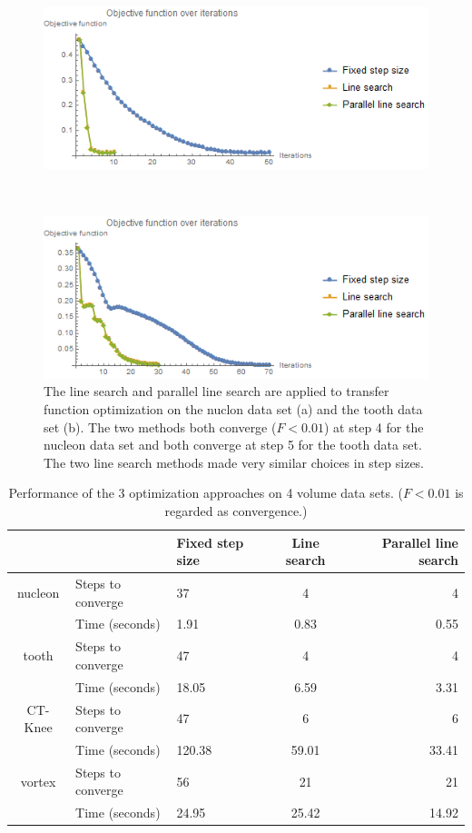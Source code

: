 \begin{figure}
	\centering
	\begin{minipage}{.49\textwidth}
		\includegraphics[width=1\linewidth]{images/CT-Knee_naive_rms_fixed_linesearch_parallel}
		\subcaption{}
	\end{minipage}~
	\begin{minipage}{.49\textwidth}
		\includegraphics[width=1\linewidth]{images/vortex_naive_rms_fixed_linesearch_parallel}
		\subcaption{}
	\end{minipage}
	\caption{The line search and parallel line search are applied to transfer function optimization on the nuclon data set (a) and the tooth data set (b). The two methods both converge ($F<0.01$) at step 4 for the nucleon data set and both converge at step 5 for the tooth data set. The two line search methods made very similar choices in step sizes.}
	\label{fig:CT-Knee_naive_vortex_naive_rms_linesearch}
\end{figure}

\begin{table}[h]
\begin{tabular}{ c | l | l c r }
& & Fixed step size & Line search & Parallel line search \\
\hline
nucleon & Steps to converge & 37 & 4 & 4 \\
& Time (seconds) & 1.91 & 0.83 & 0.55 \\
\hline
tooth & Steps to converge & 47 & 4 & 4 \\
& Time (seconds) & 18.05 & 6.59 & 3.31 \\
\hline
CT-Knee & Steps to converge & 47 & 6 & 6 \\
& Time (seconds) & 120.38 & 59.01 & 33.41 \\
\hline
vortex & Steps to converge & 56 & 21 & 21 \\
& Time (seconds) & 24.95 & 25.42 & 14.92 \\
\end{tabular}
\caption[Table caption text]{Performance of the 3 optimization approaches on 4 volume data sets. ($ F<0.01 $ is regarded as convergence.)}
\label{table:nucleon_table}
\end{table}

